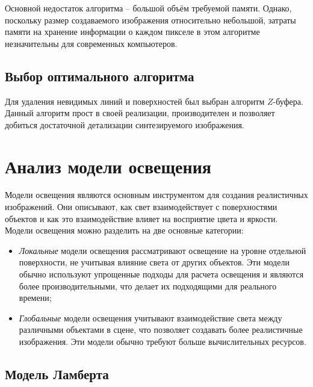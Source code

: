 Основной недостаток алгоритма – большой объём требуемой памяти. Однако, поскольку размер создаваемого изображения относительно небольшой, затраты памяти на хранение информации о каждом пикселе в этом алгоритме незначительны для современных компьютеров.

\subsection{Выбор оптимального алгоритма}

Для удаления невидимых линий и поверхностей был выбран алгоритм $Z$-буфера. Данный алгоритм прост в своей реализации, производителен и позволяет добиться достаточной детализации синтезируемого изображения.

\section{Анализ модели освещения}

Модели освещения являются основным инструментом для создания реалистичных изображений. Они описывают, как свет взаимодействует с поверхностями объектов и как это взаимодействие влияет на восприятие цвета и яркости. Модели освещения можно разделить на две основные категории:
\begin{itemize}[label=--]
	\item \textit{Локальные} модели освещения рассматривают освещение на уровне отдельной поверхности, не учитывая влияние света от других объектов. Эти модели обычно используют упрощенные подходы для расчета освещения и являются более производительными, что делает их подходящими для реального времени;
	\item \textit{Глобальные} модели освещения учитывают взаимодействие света между различными объектами в сцене, что позволяет создавать более реалистичные изображения. Эти модели обычно требуют больше вычислительных ресурсов.
\end{itemize}

\subsection{Модель Ламберта}

